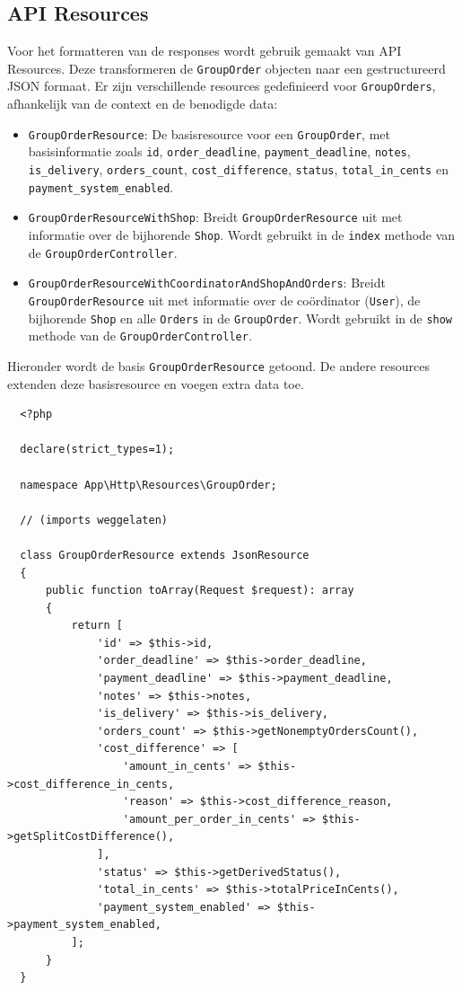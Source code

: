\subsection{API Resources}

Voor het formatteren van de responses wordt gebruik gemaakt van API Resources. Deze transformeren de \texttt{GroupOrder} objecten naar een gestructureerd JSON formaat. Er zijn verschillende resources gedefinieerd voor \texttt{GroupOrders}, afhankelijk van de context en de benodigde data:

\begin{itemize}
\item \texttt{GroupOrderResource}: De basisresource voor een \texttt{GroupOrder}, met basisinformatie zoals \texttt{id}, \texttt{order\_deadline}, \texttt{payment\_deadline}, \texttt{notes}, \texttt{is\_delivery}, \texttt{orders\_count}, \texttt{cost\_difference}, \texttt{status}, \texttt{total\_in\_cents} en \texttt{payment\_system\_enabled}.
\item \texttt{GroupOrderResourceWithShop}: Breidt \texttt{GroupOrderResource} uit met informatie over de bijhorende \texttt{Shop}. Wordt gebruikt in de \texttt{index} methode van de \texttt{GroupOrderController}.
\item \texttt{GroupOrderResourceWithCoordinatorAndShopAndOrders}: Breidt \texttt{GroupOrderResource} uit met informatie over de coördinator (\texttt{User}), de bijhorende \texttt{Shop} en alle \texttt{Orders} in de \texttt{GroupOrder}. Wordt gebruikt in de \texttt{show} methode van de \texttt{GroupOrderController}.
\end{itemize}

Hieronder wordt de basis \texttt{GroupOrderResource} getoond. De andere resources extenden deze basisresource en voegen extra data toe.

\begin{verbatim}
  <?php

  declare(strict_types=1);
  
  namespace App\Http\Resources\GroupOrder;
  
  // (imports weggelaten)	
  
  class GroupOrderResource extends JsonResource
  {
      public function toArray(Request $request): array
      {
          return [
              'id' => $this->id,
              'order_deadline' => $this->order_deadline,
              'payment_deadline' => $this->payment_deadline,
              'notes' => $this->notes,
              'is_delivery' => $this->is_delivery,
              'orders_count' => $this->getNonemptyOrdersCount(),
              'cost_difference' => [
                  'amount_in_cents' => $this->cost_difference_in_cents,
                  'reason' => $this->cost_difference_reason,
                  'amount_per_order_in_cents' => $this->getSplitCostDifference(),
              ],
              'status' => $this->getDerivedStatus(),
              'total_in_cents' => $this->totalPriceInCents(),
              'payment_system_enabled' => $this->payment_system_enabled,
          ];
      }
  }
\end{verbatim}
\label{lst:grouporderresource}

